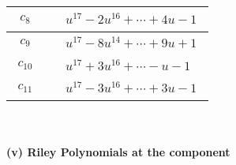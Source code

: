 \documentclass[1p]{elsarticle_modified}
\theoremstyle{definition}
\begin{document}
\begin{tabular}{m{50pt}|m{274pt}}
\hline $$\begin{aligned}c_{8}\end{aligned}$$&$\begin{aligned}
&u^{17}-2 u^{16}+\cdots+4 u-1
\end{aligned}$\\
\hline $$\begin{aligned}c_{9}\end{aligned}$$&$\begin{aligned}
&u^{17}-8 u^{14}+\cdots+9 u+1
\end{aligned}$\\
\hline $$\begin{aligned}c_{10}\end{aligned}$$&$\begin{aligned}
&u^{17}+3 u^{16}+\cdots- u-1
\end{aligned}$\\
\hline $$\begin{aligned}c_{11}\end{aligned}$$&$\begin{aligned}
&u^{17}-3 u^{16}+\cdots+3 u-1
\end{aligned}$\\
\hline
\end{tabular}\\~\\
\newpage\renewcommand{\arraystretch}{1}
\flushleft \textbf{(v) Riley Polynomials at the component}\newline \\
\end{document}
